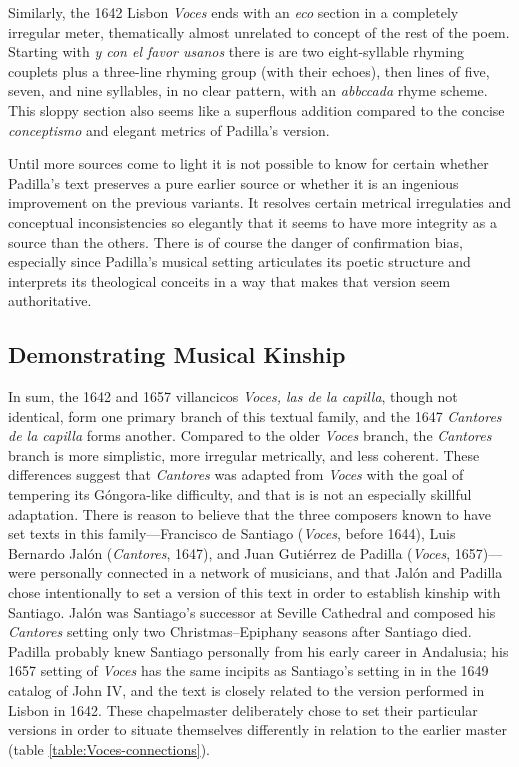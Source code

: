 Similarly, the 1642 Lisbon \emph{Voces} ends with an \emph{eco} section in a completely
irregular meter, thematically almost unrelated to concept of the rest of the
poem.
Starting with \emph{y con el favor usanos} there is are two eight-syllable rhyming
couplets plus a three-line rhyming group (with their echoes), then lines of
five, seven, and nine syllables, in no clear pattern, with an \emph{abbccada} rhyme
scheme.
This sloppy section also seems like a superflous addition compared to the
concise \emph{conceptismo} and elegant metrics of Padilla's version.

Until more sources come to light it is not possible to know for certain whether
Padilla's text preserves a pure earlier source or whether it is an
ingenious improvement on the previous variants.
It resolves certain metrical irregulaties and conceptual inconsistencies so
elegantly that it seems to have more integrity as a source than the others.
There is of course the danger of confirmation bias, especially since Padilla's
musical setting articulates its poetic structure and interprets its theological
conceits in a way that makes that version seem authoritative.

\subsection{Demonstrating Musical Kinship}

In sum, the 1642 and 1657 villancicos \emph{Voces, las de la capilla}, though not
identical, form one primary branch of this textual family, and the 1647
\emph{Cantores de la capilla} forms another.
Compared to the older \emph{Voces} branch, the \emph{Cantores} branch is more simplistic,
more irregular metrically, and less coherent.
These differences suggest that \emph{Cantores} was adapted from \emph{Voces} with the goal
of tempering its Góngora-like difficulty, and that is is not an especially
skillful adaptation.
There is reason to believe that the three composers known to have set texts in
this family---Francisco de Santiago (\emph{Voces}, before 1644), Luis Bernardo Jalón
(\emph{Cantores}, 1647), and Juan Gutiérrez de Padilla (\emph{Voces}, 1657)---were
personally connected in a network of musicians, and that Jalón and Padilla chose
intentionally to set a version of this text in order to establish kinship with
Santiago.
Jalón was Santiago's successor at Seville Cathedral and composed his \emph{Cantores}
setting only two Christmas--Epiphany seasons after Santiago died.
Padilla probably knew Santiago personally from his early career in Andalusia;
his 1657 setting of \emph{Voces} has the same incipits as Santiago's
setting in in the 1649 catalog of John IV, and the text is closely related to
the version performed in Lisbon in 1642.
These chapelmaster deliberately chose to set their particular versions in order
to situate themselves differently in relation to the earlier master (table
\ref{table:Voces-connections}).

